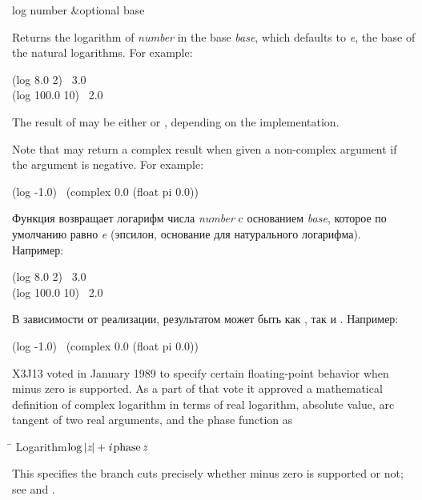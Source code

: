 \begin{defun}[Function]
log number &optional base

Returns the logarithm of \emph{number} in the base \emph{base},
which defaults to \emph{e}, the base of the natural logarithms.
For example:
\begin{lisp}
(log 8.0 2) \EV\ 3.0 \\
(log 100.0 10) \EV\ 2.0
\end{lisp}
The result of  may be either  or , depending on the
implementation.

Note that  may return a complex result when given a non-complex
argument if the argument is negative.  For example:
\begin{lisp}
(log -1.0) \EQ\ (complex 0.0 (float pi 0.0))
\end{lisp}

Функция возвращает логарифм числа \emph{number} c основанием \emph{base},
которое по умолчанию равно \emph{e} (эпсилон, основание для натурального
логарифма).
Например:
\begin{lisp}
(log 8.0 2) \EV\ 3.0 \\
(log 100.0 10) \EV\ 2.0
\end{lisp}
В зависимости от реализации, результатом  может быть как ,
так и .
Например:
\begin{lisp}
(log -1.0) \EQ\ (complex 0.0 (float pi 0.0))
\end{lisp}

\begin{new}
X3J13 voted in January 1989
to specify certain floating-point behavior when minus zero is supported.
As a part of that vote it approved a mathematical definition of complex logarithm
in terms of real logarithm, absolute value,
arc tangent of two real arguments, and the phase function as
\begin{tabbing}
\hskip 10pc\=\kill
Logarithm\>$ \log \left| \emph{z} \right| + \emph{i} \mathop\textrm{phase}\nolimits \emph{z} $
\end{tabbing}
This specifies the branch cuts precisely whether minus zero is supported or not;
see  and .
\end{new}
\end{defun}

